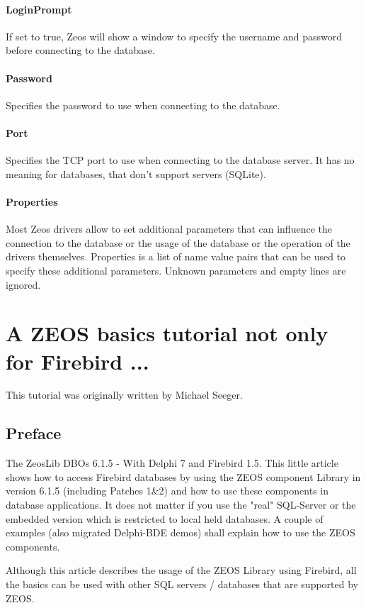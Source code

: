 \documentclass[a4paper,12pt,oneside]{book}
\begin{document}
\subsubsection{LoginPrompt}
If set to true, Zeos will show a window to specify the username and password before connecting to the database.

\subsubsection{Password}
Specifies the password to use when connecting to the database.

\subsubsection{Port}
Specifies the TCP port to use when connecting to the database server.
It has no meaning for databases, that don't support servers (SQLite).

\subsubsection{Properties}
Most Zeos drivers allow to set additional parameters that can influence the connection to the database or the usage of the database or the operation of the drivers themselves.
Properties is a list of name value pairs that can be used to specify these additional parameters.
Unknown parameters and empty lines are ignored.



\chapter{A ZEOS basics tutorial not only for Firebird ...}
This tutorial was originally written by Michael Seeger.

\section{Preface}
The ZeosLib DBOs 6.1.5 - With Delphi 7 and Firebird 1.5.
This little article shows how to access Firebird databases by using the ZEOS component Library in version 6.1.5 (including Patches 1\&2) and how to use these components in database applications.
It does not matter if you use the "real" SQL-Server or the embedded version which is restricted to local held databases.
A couple of examples (also migrated Delphi-BDE demos) shall explain how to use the ZEOS
components.

Although this article describes the usage of the ZEOS Library using Firebird, all the basics can be used with other SQL servers / databases that are supported by ZEOS.
\end{document}
